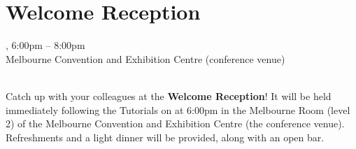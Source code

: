 \clearpage
\section[Welcome Reception]{Welcome Reception}
\setheaders{}{\daydateyear}

\begin{center}


\daydateyear, 6:00pm -- 8:00pm \vspace{1em}\\
Melbourne Convention and Exhibition Centre (conference venue)\\
\WelcomeReceptionLoc\\
\end{center}

\noindent Catch up with your colleagues at the \textbf{Welcome
Reception}! It will be held immediately following the Tutorials
on \daydate at 6:00pm in the Melbourne Room (level 2) of the 
Melbourne Convention and Exhibition Centre (the conference venue).  
Refreshments and a light dinner will be provided, along with an
open bar.
